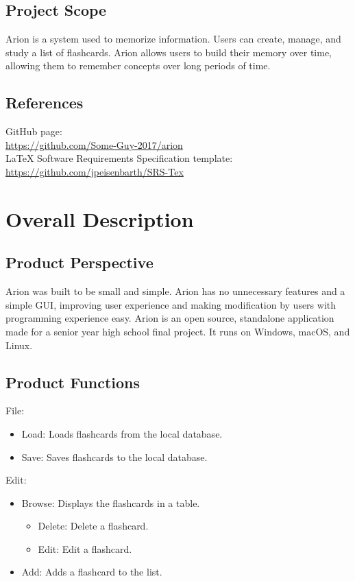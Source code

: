\documentclass{scrreprt}
\begin{document}
\section{Project Scope}
Arion is a system used to memorize information. Users can create, manage, and study a list of flashcards.
Arion allows users to build their memory over time, allowing them to remember concepts over long periods of time.

\section{References}
\begin{flushleft} 
    GitHub page: \\
    \url{https://github.com/Some-Guy-2017/arion} \\
    LaTeX Software Requirements Specification template: \\
    \url{https://github.com/jpeisenbarth/SRS-Tex} \\
\end{flushleft}


\chapter{Overall Description}

\section{Product Perspective}
Arion was built to be small and simple.
Arion has no unnecessary features and a simple GUI, improving user experience and making modification by users
with programming experience easy.
Arion is an open source, standalone application made for a senior year high school final project.
It runs on Windows, macOS, and Linux.

\section{Product Functions}
File:
\begin{itemize}
    \item Load: Loads flashcards from the local database.
    \item Save: Saves flashcards to the local database.
\end{itemize}

Edit:
\begin{itemize}
    \item Browse: Displays the flashcards in a table.
    \begin{itemize}
        \item Delete: Delete a flashcard.
        \item Edit: Edit a flashcard.
    \end{itemize}
    \item Add: Adds a flashcard to the list.
\end{itemize}
\end{document}
